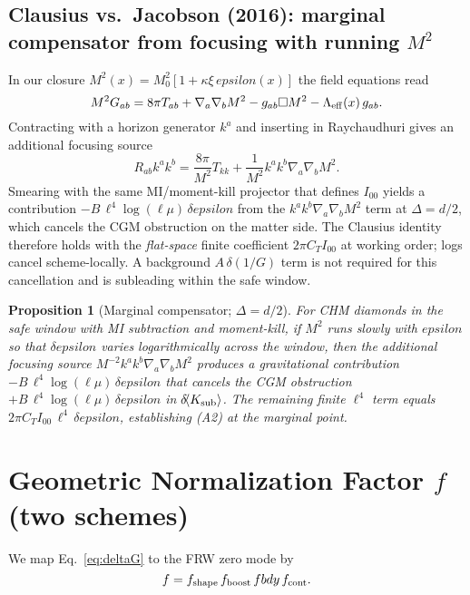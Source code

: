 \documentclass[aps,prd,onecolumn,superscriptaddress,nofootinbib]{revtex4-2}
\def\fbdy{fbdy}%
\def\eps{epsilon}%
\newcommand{\fbdy}{f_{\rm bdy}}
\newcommand{\eps}{\varepsilon}
\newtheorem{proposition}{Proposition}
\begin{document}
\subsection{Clausius vs.\ Jacobson (2016): marginal compensator from focusing with running \texorpdfstring{$M^2$}{M2}}
\label{sec:clausius-vs-jacobson}
In our closure \(M^2(x)=M_0^2[1+\kappa\xi\,\eps(x)]\) the field equations read
\begin{equation}
\label{eq:eom-jordan-2}
M^2 G_{ab}=8\pi T_{ab}+\nabla_a\nabla_b M^2-g_{ab}\Box M^2-\Lambda_{\rm eff}(x)\,g_{ab}.
\end{equation}
Contracting with a horizon generator \(k^a\) and inserting in Raychaudhuri gives an additional focusing source
\begin{equation}
\label{eq:focusing-source}
R_{ab}k^a k^b=\frac{8\pi}{M^2}T_{kk}+\frac{1}{M^2}k^a k^b\nabla_a\nabla_b M^2.
\end{equation}
Smearing with the same MI/moment-kill projector that defines \(I_{00}\) yields a contribution \(-B\,\ell^4\log(\ell\mu)\,\delta\eps\) from the \(k^a k^b\nabla_a\nabla_b M^2\) term at \(\Delta=d/2\), which cancels the CGM obstruction on the matter side. The Clausius identity therefore holds with the \emph{flat-space} finite coefficient \(2\pi C_T I_{00}\) at working order; logs cancel scheme-locally. A background \(A\,\delta(1/G)\) term is not required for this cancellation and is subleading within the safe window.

\begin{proposition}[Marginal compensator; \(\Delta=d/2\)]
\label{prop:marginal}
For CHM diamonds in the safe window with MI subtraction and moment-kill, if \(M^2\) runs slowly with \(\eps\) so that \(\delta\eps\) varies logarithmically across the window, then the additional focusing source \(M^{-2}k^a k^b\nabla_a\nabla_b M^2\) produces a gravitational contribution \(-B\,\ell^4\log(\ell\mu)\,\delta\eps\) that cancels the CGM obstruction \(+B\,\ell^4\log(\ell\mu)\,\delta\eps\) in \(\delta\!\langle K_{\rm sub}\rangle\). The remaining finite \(\ell^4\) term equals \(2\pi C_T I_{00}\,\ell^4\,\delta\eps\), establishing (A2) at the marginal point.
\end{proposition}

\section{Geometric Normalization Factor \texorpdfstring{$f$}{f} (two schemes)}
\label{sec:f-norm}
We map Eq.~\eqref{eq:deltaG} to the FRW zero mode by
\begin{equation}
f = f_{\rm shape}\, f_{\rm boost}\, \fbdy\, f_{\rm cont}.
\end{equation}
\end{document}
